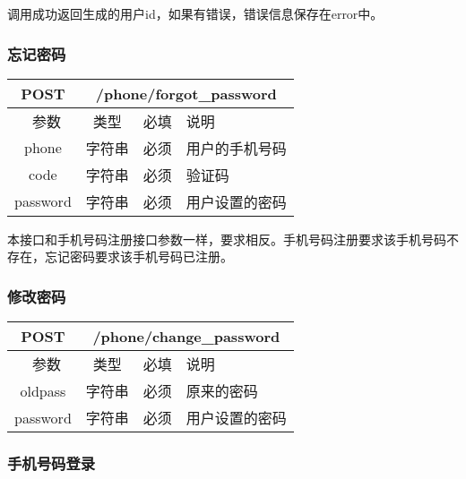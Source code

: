 调用成功返回生成的用户id，如果有错误，错误信息保存在error中。


\subsubsection{忘记密码}
\label{hash_algorithm}

\begin{table}[H]
   \begin{center}
\begin{tabular}{|c|c|c|p{12cm}|}
\hline
POST & \multicolumn{3}{|c|}{/phone/forgot\_password} \\
\hline\hline
 \  参数  & 类型 & 必填 &  说明  \\
\hline
 phone  & 字符串 & 必须 &  用户的手机号码\\
\hline
 code  & 字符串 & 必须 &  验证码\\
\hline
 password  & 字符串 & 必须 &  用户设置的密码\\
\hline
\end{tabular}
   \end{center}
\end{table}

本接口和手机号码注册接口参数一样，要求相反。手机号码注册要求该手机号码不存在，忘记密码要求该手机号码已注册。


\subsubsection{修改密码}
\label{hash_algorithm}

\begin{table}[H]
   \begin{center}
\begin{tabular}{|c|c|c|p{12cm}|}
\hline
POST & \multicolumn{3}{|c|}{/phone/change\_password} \\
\hline\hline
 \  参数  & 类型 & 必填 &  说明  \\
\hline
 oldpass  & 字符串 & 必须 &  原来的密码\\
\hline
 password  & 字符串 & 必须 &  用户设置的密码\\
\hline
\end{tabular}
   \end{center}
\end{table}



\subsubsection{手机号码登录}
\label{hash_algorithm}

